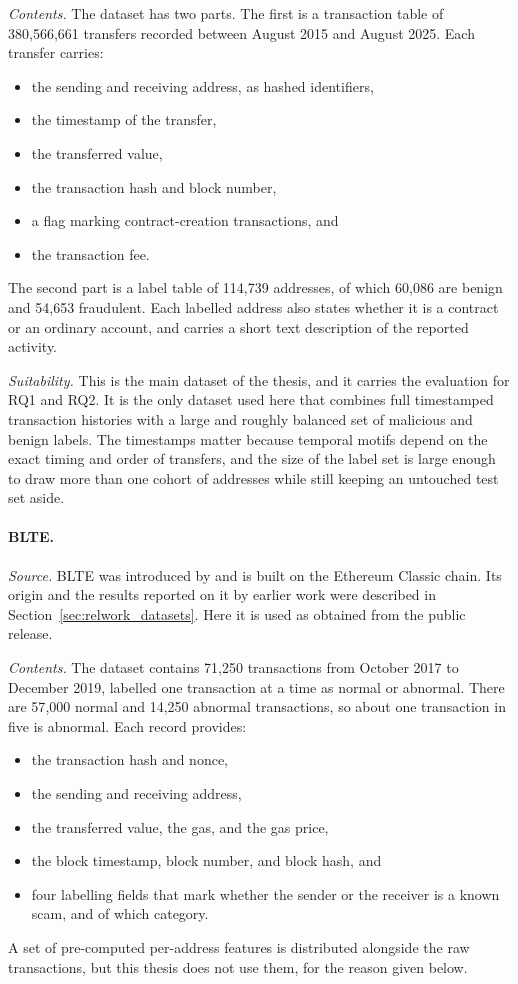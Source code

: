 \documentclass{thesisclass}
\begin{document}
\textit{Contents.} The dataset has two parts. The first is a transaction table
of 380{,}566{,}661 transfers recorded between August 2015 and August 2025. Each
transfer carries:
\begin{itemize}
  \item the sending and receiving address, as hashed identifiers,
  \item the timestamp of the transfer,
  \item the transferred value,
  \item the transaction hash and block number,
  \item a flag marking contract-creation transactions, and
  \item the transaction fee.
\end{itemize}
The second part is a label table of 114{,}739 addresses, of which 60{,}086 are
benign and 54{,}653 fraudulent. Each labelled address also states whether it is
a contract or an ordinary account, and carries a short text description of the
reported activity.

\textit{Suitability.} This is the main dataset of the thesis, and it carries the
evaluation for RQ1 and RQ2. It is the only dataset used here that
combines full timestamped transaction histories with a large and roughly
balanced set of malicious and benign labels. The timestamps matter because
temporal motifs depend on the exact timing and order of transfers, and the size
of the label set is large enough to draw more than one cohort of addresses while
still keeping an untouched test set aside.

\paragraph{BLTE.}
\label{sec:dataset_blte}
\textit{Source.} BLTE was introduced by \citet{alemari2021labeled} and is built
on the Ethereum Classic chain. Its origin and the results reported on it by
earlier work were described in Section~\ref{sec:relwork_datasets}. Here it is
used as obtained from the public release.

\textit{Contents.} The dataset contains 71{,}250 transactions from October 2017
to December 2019, labelled one transaction at a time as normal or abnormal.
There are 57{,}000 normal and 14{,}250 abnormal transactions, so about one
transaction in five is abnormal. Each record provides:
\begin{itemize}
  \item the transaction hash and nonce,
  \item the sending and receiving address,
  \item the transferred value, the gas, and the gas price,
  \item the block timestamp, block number, and block hash, and
  \item four labelling fields that mark whether the sender or the receiver is a
        known scam, and of which category.
\end{itemize}
A set of pre-computed per-address features is distributed alongside the raw
transactions, but this thesis does not use them, for the reason given below.
\end{document}
